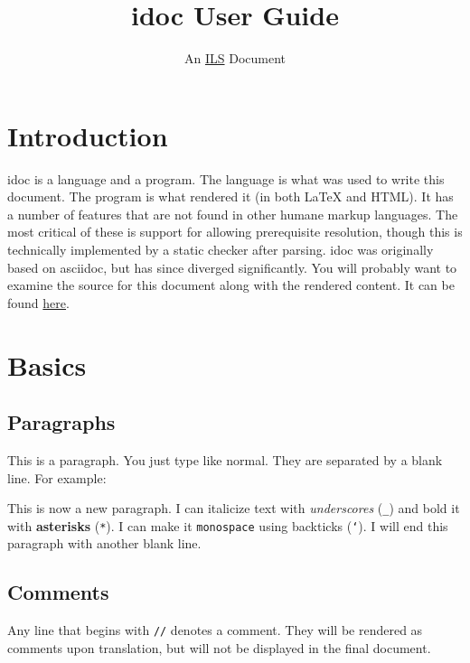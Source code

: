 \documentclass[mpinclude=true]{scrartcl}
\title{idoc User Guide}
\subtitle{An \href{https://www.independentlearning.science}{ILS} Document}
\begin{document}
\maketitle
\tableofcontents
\pagestyle{headings}

\section{Introduction}


idoc is a language and a program.  The language is what was used to
write this document.  The program is what rendered it (in both LaTeX
and HTML).  It has a number of features that are not found in other
humane markup languages.  The most critical of these is support for
allowing prerequisite resolution, though this is technically
implemented by a static checker after parsing.  idoc was originally
based on asciidoc, but has since diverged significantly.  You will
probably want to examine the source for this document along with the
rendered content.  It can be found
\href{httpswww.independentlearning.science/source.idoc}{here}.

\section{Basics}


\subsection{Paragraphs}


This is a paragraph.  You just type like normal.  They are separated
by a blank line.  For example:

This is now a new paragraph.  I can italicize text with \emph{underscores}
(\texttt{\_}) and bold it with \textbf{asterisks} (\texttt{*}).  I can make it \texttt{monospace}
using backticks (\texttt{`}).  I will end this paragraph with another blank
line.

\subsection{Comments}


Any line that begins with \texttt{//} denotes a comment.  They will be
rendered as comments upon translation, but will not be displayed in
the final document.


\end{document}
